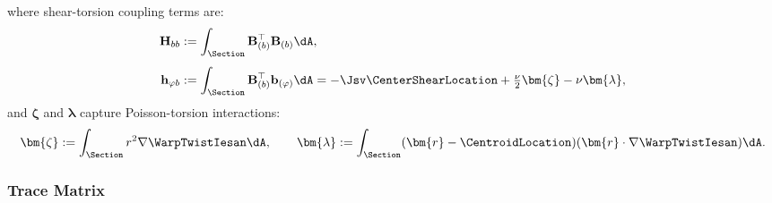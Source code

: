 %
where shear-torsion coupling terms are:
\begin{align}
\mathbf{H}_{bb} &:= \int_\Section \mathbf{B}_{(b)}^\top \mathbf{B}_{(b)} \dA, 
\label{eq:def-H-bb} \\[4pt]
\mathbf{h}_{\varphi b} &:= \int_\Section \mathbf{B}_{(b)}^\top \mathbf{b}_{(\varphi)} \dA 
= -\Jsv\CenterShearLocation + \tfrac{\nu}{2}\bm{\zeta} - \nu\bm{\lambda},
\label{eq:h-coupling}
\end{align}
and $\bm{\zeta}$ and $\bm{\lambda}$ capture Poisson-torsion interactions:
\begin{equation}
\bm{\zeta} := \int_\Section r^2 \nabla\WarpTwistIesan \dA, \qquad 
\bm{\lambda} := \int_\Section (\bm{r} - \CentroidLocation)(\bm{r} \cdot \nabla\WarpTwistIesan) \dA.
\label{eq:def-zeta-lambda}
\end{equation}

\subsubsection{Trace Matrix}

